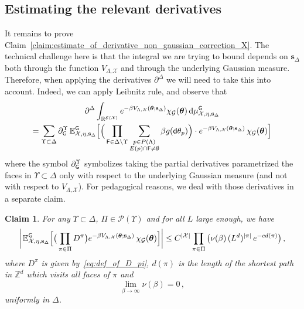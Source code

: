 \documentclass[11pt]{article}
\newtheorem{claim}[theorem]{Claim}
\theoremstyle{definition}
\theoremstyle{remark}
\numberwithin{theorem}{section}
\def\La{{\Lambda}}
\newcommand{\bR}{\mathbb R}
\newcommand{\bZ}{\mathbb Z}
\newcommand{\bE}{\mathbb E}
\newcommand{\cE}{\mathcal{E}}
\begin{document}
    \subsection{Estimating the relevant derivatives}
    It remains to prove Claim~\ref{claim:estimate_of_derivative_non_gaussian_correction_X}. The technical challenge here is that the integral we are trying to bound depends on $\mathbf{s}_{\Delta}$ both through the function $V_{\La,\mathcal{X}}$ and through the underlying Gaussian measure. Therefore, when applying the derivatives $\partial^\Delta$ we will need to take this into account. Indeed, we can apply Leibnitz rule, and observe that
    \begin{multline} \label{eq:derivative_of_Xi_wrt_Delta_after_leibnitz}
    \partial^\Delta \int_{\bR^{\cE(\mathcal{X})}} e^{-\beta V_{\Lambda,\mathcal{X}}(\boldsymbol{\theta};\mathbf{s}_\Delta)} \chi_{\mathcal{G}}(\boldsymbol{\theta}) \, {\rm d}\mu_{\mathcal{X},\eta,\mathbf{s}_\Delta}^{\sf G} \\  = \sum_{\Upsilon\subset \Delta} \partial_{{\sf G}}^{\Upsilon}  \, \bE_{\mathcal{X},\eta,\mathbf{s}_{\Delta}}^{\sf G}\Big[ \Big( \prod_{{\sf F} \in \Delta\setminus \Upsilon} \sum_{\substack{p\in P(\La) \\ E(p)\cap {\sf F} \not= \emptyset }}\beta g({\sf d} \theta_p)\Big) \cdot e^{-\beta V_{\La,\mathcal{X}} (\boldsymbol{\theta}; \mathbf{s}_{\Delta})} \, \chi_{\mathcal{G}} (\boldsymbol{\theta}) \Big]
    \end{multline}
    where the symbol $\partial_{\sf G}^{\Upsilon}$ symbolizes taking the partial derivatives parametrized the faces in $\Upsilon\subset \Delta$ only with respect to the underlying Gaussian measure (and not with respect to $V_{\La,\mathcal{X}}$). 
    For pedagogical reasons, we deal with those derivatives in a separate claim. 
    \begin{claim} \label{claim:bound_of_derivative_of_non_gaussian_correction_with_repsect_to_gaussian_measure}
        For any $\Upsilon\subset \Delta$, $\Pi\in \mathcal{P}(\Upsilon)$ and for all $L$ large enough, we have
        \[
        \bigg| \,  \bE_{\mathcal{X},\eta,\mathbf{s}_{\Delta}}^{\sf G} \Big[ \big( \prod_{\pi\in \Pi} D^\pi\big) e^{-\beta V_{\La,\mathcal{X}} (\boldsymbol{\theta}; \mathbf{s}_{\Delta})} \, \chi_{\mathcal{G}} (\boldsymbol{\theta})  \Big] \bigg| \le C^{|\mathcal{X}|} \prod_{\pi\in \Pi} \big(\nu(\beta) \, (L^{d})^{|\pi|} \, e^{-c d(\pi)}\big)\, , 
        \]
        where $D^\pi$ is given by~\eqref{eq:def_of_D_pi}, $d(\pi)$ is the length of the shortest path in $\bZ^d$ which visits all faces of $\pi$ and 
        \[
        \lim_{\beta\to \infty} \nu(\beta) = 0 \, ,
        \]
        uniformly in $\Delta$. 
    \end{claim}
    
\end{document}
